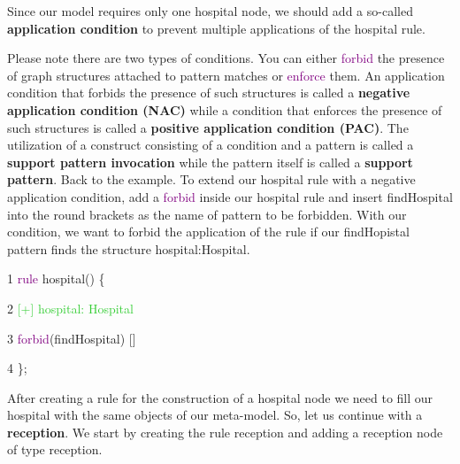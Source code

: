 Since our model requires only one hospital node, we should add a so-called \textbf{application condition} to prevent multiple applications of the hospital rule.\newline

Please note there are two types of conditions. You can either \textcolor{Purple}{forbid} the presence of graph structures attached to pattern matches or \textcolor{Purple}{enforce} them.
An application condition that forbids the presence of such structures is called a \textbf{negative application condition (NAC)} while a condition that enforces the presence of such structures is called a \textbf{positive application condition (PAC)}.
\newline
The utilization of a construct consisting of a condition and a pattern is called a \textbf{support pattern invocation} while the pattern itself is called a \textbf{support pattern}.\newline \newline
Back to the example. To extend our hospital rule with a negative application condition, add a \textcolor{Purple}{forbid} inside our hospital rule and insert \textsf{findHospital} into the round brackets as the name of pattern to be forbidden.\newline
With our condition, we want to forbid the application of the rule if our \textsf{findHopistal} pattern finds the structure \textsf{hospital:Hospital}.\newline

{

1 \hspace{0.5cm} \textcolor{Purple}{rule} hospital() \{ 

2 \hspace{1cm} \textcolor{LimeGreen}{[+] hospital: Hospital}

3 \hspace{1cm} \textcolor{Purple}{forbid}(findHospital) [] 

4 \hspace{0.5cm} \};\newline

}

After creating a rule for the construction of a hospital node we need to fill our hospital with the same objects of our meta-model. So, let us continue with a \textbf{reception}. We start by creating the rule \textsf{reception} and adding a reception node of type reception.\newline

